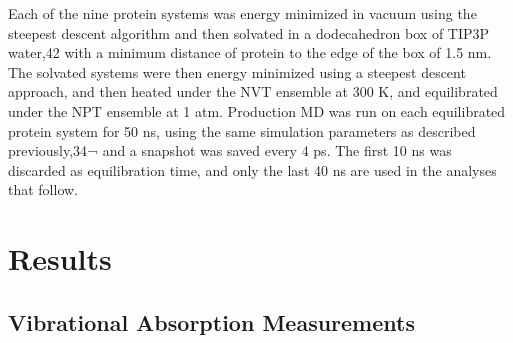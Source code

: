 Each of the nine protein systems was energy minimized in vacuum using the steepest descent algorithm and then solvated in a dodecahedron box of TIP3P water,42 with a minimum distance of protein to the edge of the box of 1.5 nm.
The solvated systems were then energy minimized using a steepest descent approach, and then heated under the NVT ensemble at 300 K, and equilibrated under the NPT ensemble at 1 atm.
Production MD was run on each equilibrated protein system for 50 ns, using the same simulation parameters as described previously,34¬ and a snapshot was saved every 4 ps.
The first 10 ns was discarded as equilibration time, and only the last 40 ns are used in the analyses that follow.

\section{Results}\label{results}
\subsection{Vibrational Absorption Measurements}

